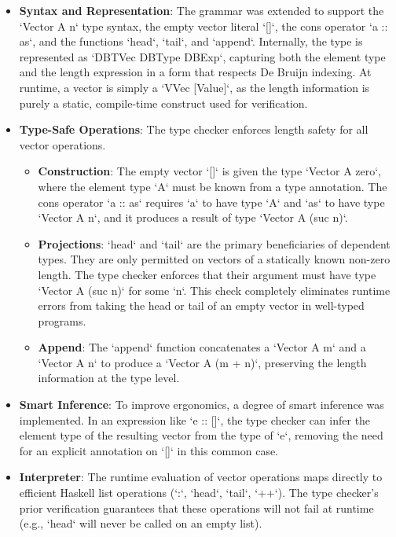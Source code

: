 \begin{itemize}
    \item \textbf{Syntax and Representation}: The grammar was extended to support the `Vector A n` type syntax, the empty vector literal `[]`, the cons operator `a :: as`, and the functions `head`, `tail`, and `append`. Internally, the type is represented as `DBTVec DBType DBExp`, capturing both the element type and the length expression in a form that respects De Bruijn indexing. At runtime, a vector is simply a `VVec [Value]`, as the length information is purely a static, compile-time construct used for verification.

    \item \textbf{Type-Safe Operations}: The type checker enforces length safety for all vector operations.
    \begin{itemize}
        \item \textbf{Construction}: The empty vector `[]` is given the type `Vector A zero`, where the element type `A` must be known from a type annotation. The cons operator `a :: as` requires `a` to have type `A` and `as` to have type `Vector A n`, and it produces a result of type `Vector A (suc n)`.
        \item \textbf{Projections}: `head` and `tail` are the primary beneficiaries of dependent types. They are only permitted on vectors of a statically known non-zero length. The type checker enforces that their argument must have type `Vector A (suc n)` for some `n`. This check completely eliminates runtime errors from taking the head or tail of an empty vector in well-typed programs.
        \item \textbf{Append}: The `append` function concatenates a `Vector A m` and a `Vector A n` to produce a `Vector A (m + n)`, preserving the length information at the type level.
    \end{itemize}

    \item \textbf{Smart Inference}: To improve ergonomics, a degree of smart inference was implemented. In an expression like `e :: []`, the type checker can infer the element type of the resulting vector from the type of `e`, removing the need for an explicit annotation on `[]` in this common case.

    \item \textbf{Interpreter}: The runtime evaluation of vector operations maps directly to efficient Haskell list operations (`:`, `head`, `tail`, `++`). The type checker's prior verification guarantees that these operations will not fail at runtime (e.g., `head` will never be called on an empty list).
\end{itemize}

